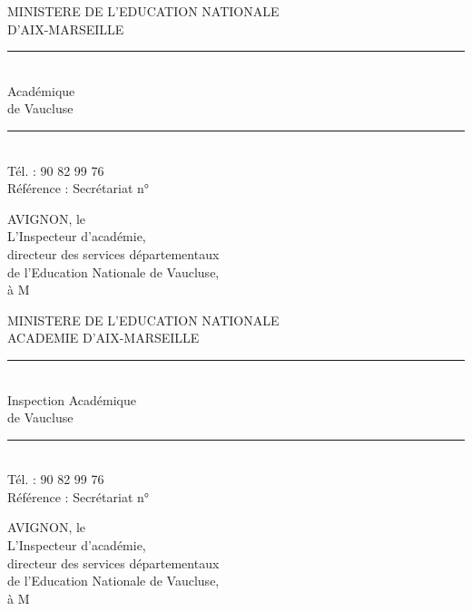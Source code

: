 {

}

\noindent\begin{minipage}[t]{.48\linewidth}\raggedright\small
MINISTERE DE L'EDUCATION NATIONALE\\
 D'AIX-MARSEILLE\\
\hspace{2em}\rule{2cm}{0.3pt}\\
 Académique\\
de Vaucluse\\
\hspace{2em}\rule{2cm}{0.3pt}\\
Tél. : 90 82 99 76\\
Référence : Secrétariat n°
\end{minipage}\hfill%
\begin{minipage}[t]{.48\linewidth}\raggedright\small
AVIGNON, le\\
L'Inspecteur d'académie,\\
directeur des services départementaux\\
de l'Education Nationale de Vaucluse,\\
à M
\end{minipage}



\noindent\begin{minipage}[t]{.48\linewidth}\raggedright\small
MINISTERE DE L'EDUCATION NATIONALE\\
ACADEMIE D'AIX-MARSEILLE\\
\hspace{2em}\rule{2cm}{0.3pt}\\
Inspection Académique\\
de Vaucluse\\
\hspace{2em}\rule{2cm}{0.3pt}\\
Tél. : 90 82 99 76\\
Référence : Secrétariat n°
\end{minipage}\hfill%
\begin{minipage}[t]{.48\linewidth}\raggedright\small
AVIGNON, le\\
L'Inspecteur d'académie,\\
directeur des services départementaux\\
de l'Education Nationale de Vaucluse,\\
à M
\end{minipage}


